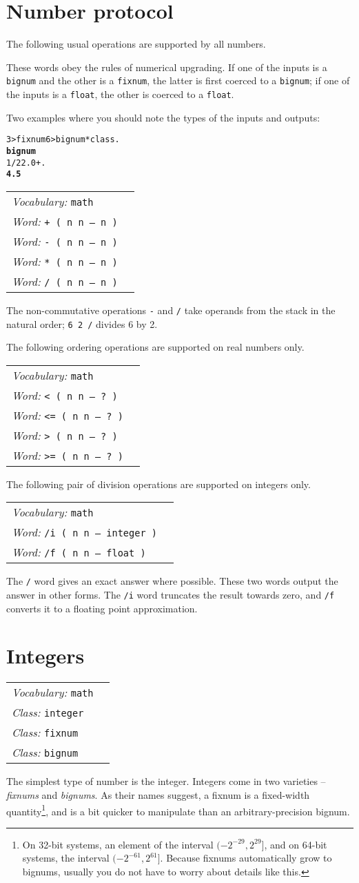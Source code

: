 \documentclass{book}
\newcommand{\vocabulary}[1]{\emph{Vocabulary:} \texttt{#1}&\\}
\newcommand{\ordinaryword}[2]{\index{\texttt{#1}}\emph{Word:} \texttt{#2}&\\}
\newcommand{\classword}[1]{\index{\texttt{#1}}\emph{Class:} \texttt{#1}&\\}
\newcommand{\wordtable}[1]{


\begin{tabularx}{12cm}{lX}
\hline
#1
\hline
\end{tabularx}

}
\begin{document}
\section{Number protocol}\label{number-protocol}

\numupgradeglos

The following usual operations are supported by all numbers.

These words obey the rules of numerical upgrading. If one of the inputs is a \texttt{bignum} and the other is a \texttt{fixnum}, the latter is first coerced to a \texttt{bignum}; if one of the inputs is a \texttt{float}, the other is coerced to a \texttt{float}.

Two examples where you should note the types of the inputs and outputs:
\begin{alltt}
  3 >fixnum 6 >bignum * class .
\textbf{bignum}
  1/2 2.0 + .
\textbf{4.5}
\end{alltt}

\wordtable{
\vocabulary{math}
\ordinaryword{+}{+ ( n n -- n )}
\ordinaryword{-}{- ( n n -- n )}
\ordinaryword{*}{* ( n n -- n )}
\ordinaryword{/}{/ ( n n -- n )}
}
The non-commutative operations \texttt{-} and \texttt{/} take operands from the stack in the natural order; \texttt{6 2 /} divides 6 by 2.

The following ordering operations are supported on real numbers only.

\wordtable{
\vocabulary{math}
\ordinaryword{<}{< ( n n -- ?~)}
\ordinaryword{<=}{<= ( n n -- ?~)}
\ordinaryword{>}{> ( n n -- ?~)}
\ordinaryword{>=}{>= ( n n -- ?~)}
}

The following pair of division operations are supported on integers only.

\wordtable{
\vocabulary{math}
\ordinaryword{/i}{/i ( n n -- integer )}
\ordinaryword{/f}{/f ( n n -- float )}
}
The \texttt{/} word gives an exact answer where possible. These two words output the answer in other forms. The \texttt{/i} word truncates the result towards zero, and \texttt{/f} converts it to a floating point approximation.

\section{Integers}\label{integers}

\integerglos

\wordtable{
\vocabulary{math}
\classword{integer}
\classword{fixnum}
\classword{bignum}
}
The simplest type of number is the integer. Integers come in two varieties -- \emph{fixnums} and \emph{bignums}. As their names suggest, a fixnum is a fixed-width quantity\footnote{On 32-bit systems, an element of the interval $(-2^{-29},2^{29}]$, and on 64-bit systems, the interval $(-2^{-61},2^{61}]$. Because fixnums automatically grow to bignums, usually you do not have to worry about details like this.}, and is a bit quicker to manipulate than an arbitrary-precision bignum.
\end{document}

